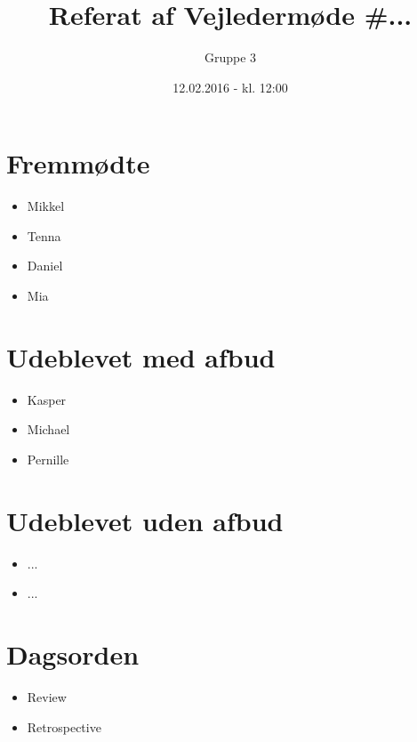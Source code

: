 \documentclass{article}
\title{Referat af Vejledermøde \#...}
\author{Gruppe 3}
\date{12.02.2016 - kl. 12:00}
\begin{document}
	\maketitle
	
	\section{Fremmødte}
	\begin{itemize}
		\item Mikkel
		\item Tenna
		\item Daniel
		\item Mia
	\end{itemize}
	
	\section{Udeblevet med afbud}
	\begin{itemize}
		\item Kasper
		\item Michael
		\item Pernille
	\end{itemize}
	
	\section{Udeblevet uden afbud}
	\begin{itemize}
		\item ...
		\item ...
	\end{itemize}
	
	\section{Dagsorden}
	\begin{itemize}
		\item Review
		\item Retrospective
	\end{itemize}
	
\end{document}
